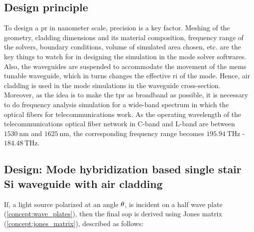 \documentclass[../report.tex]{subfiles}
\begin{document}
		\subsection{Design principle}
To design a \gls{pr} in nanometer scale, precision is a key factor. Meshing of the geometry, cladding dimensions and its material composition, frequency range of the solvers, boundary conditions, volume of simulated area chosen, etc. are the key things to watch for in designing the simulation in the mode solver softwares. Also, the waveguides are suspended to accommodate the movement of the \gls{mems} tunable waveguide, which in turns changes the effective \gls{ri} of the mode. Hence, air cladding is used in the mode simulations in the waveguide cross-section. Moreover, as the idea is to make the \gls{tpr} as broadband as possible, it is necessary to do frequency analysis simulation for a wide-band spectrum in which the optical fibers for telecommunications work. As the operating wavelength of the telecommunications optical fiber network in C-band and L-band are between $\SI{1530}{\nano\metre}$ and $\SI{1625}{\nano\metre}$, the corresponding frequency range becomes $\SI{195.94}{\THz}$ - $\SI{184.48}{\THz}$.
	
		\subsection{Design: Mode hybridization based single stair Si waveguide with air cladding}

If, a light source polarized at an angle $\mathrm{\theta}$, is incident on a half wave plate (\ref{concept:wave_plates}), then the final \gls{sop} is derived using Jones matrix (\ref{concept:jones_matrix}), described as follows:
\end{document}
